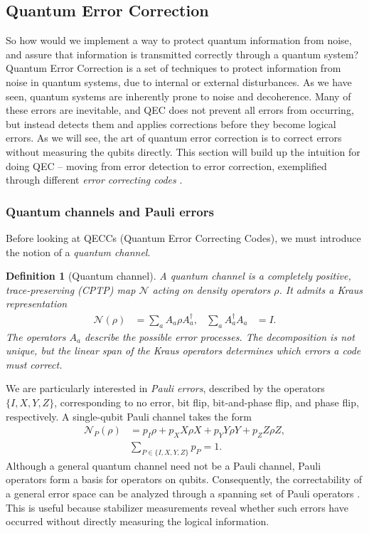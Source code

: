 \documentclass[amssymb,twocolumn,aps]{revtex4-2}
\newtheorem{definition}{Definition}[section]
\begin{document}
\subsection{Quantum Error Correction}

So how would we implement a way to protect quantum information from noise, and assure that information is transmitted correctly through a quantum system? Quantum Error Correction is a set of techniques to protect information from noise in quantum systems, due to internal or external disturbances. As we have seen, quantum systems are inherently prone to noise and decoherence. Many of these errors are inevitable, and QEC does not prevent all errors from occurring, but instead detects them and applies corrections before they become logical errors. As we will see, the art of quantum error correction is to correct errors without measuring the qubits directly. This section will build up the intuition for doing QEC -- moving from error detection to error correction, exemplified through different \textit{error correcting codes} \cite{gottesman2024surviving,terhal2015quantum}.

\subsubsection*{Quantum channels and Pauli errors}

Before looking at QECCs (Quantum Error Correcting Codes), we must introduce the notion of a \textit{quantum channel}.
\begin{definition}[Quantum channel]
A quantum channel is a completely positive, trace-preserving (CPTP) map $\mathcal{N}$ acting on density operators $\rho$. It admits a Kraus representation
\begin{align*}
    \mathcal{N}(\rho)&=\sum_a A_a\rho A_a^\dagger, &
    \sum_a A_a^\dagger A_a&=I.
\end{align*}
The operators $A_a$ describe the possible error processes. The decomposition is not unique, but the linear span of the Kraus operators determines which errors a code must correct.
\end{definition}

We are particularly interested in \textit{Pauli errors}, described by the operators $\{I,X,Y,Z\}$, corresponding to no error, bit flip, bit-and-phase flip, and phase flip, respectively. A single-qubit Pauli channel takes the form
\begin{align*}
    \mathcal{N}_{P}(\rho)
    &=p_I\rho+p_XX\rho X
      +p_YY\rho Y+p_ZZ\rho Z,\\
    &\sum_{P\in\{I,X,Y,Z\}}p_P=1.
\end{align*}
Although a general quantum channel need not be a Pauli channel, Pauli operators form a basis for operators on qubits. Consequently, the correctability of a general error space can be analyzed through a spanning set of Pauli operators \cite{gottesman2024surviving,knill1997theory}. This is useful because stabilizer measurements reveal whether such errors have occurred without directly measuring the logical information.
\end{document}
